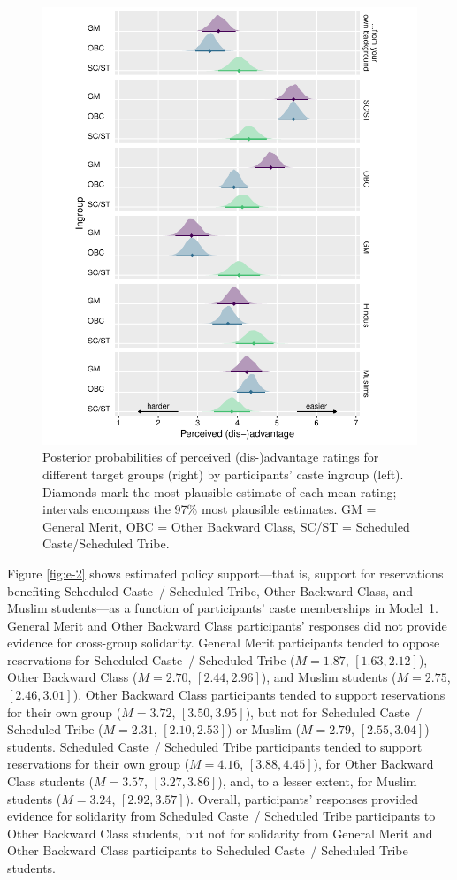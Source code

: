 \documentclass[12pt, a4paper]{article}
\begin{document}
\begin{figure}
\centering
\includegraphics[scale=1]{../figures/figure-7}
\caption{
Posterior probabilities of perceived (dis-)advantage ratings for different target groups (right) by participants' caste ingroup (left). Diamonds mark the most plausible estimate of each mean rating; intervals encompass the 97\% most plausible estimates. GM = General Merit, OBC = Other Backward Class, SC/ST = Scheduled Caste/Scheduled Tribe.
}
\label{fig:e-1}
\end{figure}

Figure \ref{fig:e-2} shows estimated policy support---that is, support for reservations benefiting Scheduled Caste~/ Scheduled Tribe, Other Backward Class, and Muslim students---as a function of participants' caste memberships in Model~1. General Merit and Other Backward Class participants' responses did not provide evidence for cross-group solidarity. General Merit participants tended to oppose reservations for Scheduled Caste~/ Scheduled Tribe ($M = 1.87$, $[1.63, 2.12]$), Other Backward Class ($M = 2.70$, $[2.44, 2.96]$), and Muslim students ($M = 2.75$, $[2.46, 3.01]$). Other Backward Class participants tended to support reservations for their own group ($M = 3.72$, $[3.50, 3.95]$), but not for Scheduled Caste~/ Scheduled Tribe ($M = 2.31$, $[2.10, 2.53]$) or Muslim ($M = 2.79$, $[2.55, 3.04]$) students. Scheduled Caste~/ Scheduled Tribe participants tended to support reservations for their own group ($M = 4.16$, $[3.88, 4.45]$), for Other Backward Class students ($M = 3.57$, $[3.27, 3.86]$), and, to a lesser extent, for Muslim students ($M = 3.24$, $[2.92, 3.57]$). Overall, participants' responses provided evidence for solidarity from Scheduled Caste~/ Scheduled Tribe participants to Other Backward Class students, but not for solidarity from General Merit and Other Backward Class participants to Scheduled Caste~/ Scheduled Tribe students. 
\end{document}
